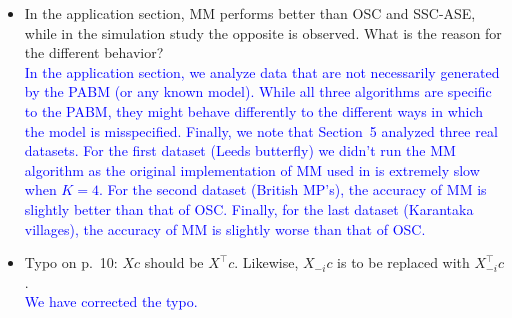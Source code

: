 \documentclass[
]{article}
\begin{document}
\begin{itemize}
{  }
\item
  In the application section, MM performs better than OSC and SSC-ASE,
  while in the simulation study the opposite is observed. What is the
  reason for the different behavior?\\
  \textcolor{blue}{
  In the application section, we analyze data that are not necessarily generated by the PABM (or any known model). 
  While all three algorithms are specific to the PABM, they might behave
  differently to the different ways in which the model is
  misspecified. Finally, we note that Section~5 analyzed three real
  datasets. For the first dataset (Leeds butterfly) we didn't run the MM
  algorithm as the original implementation of MM used in 
  \cite{307cbeb9b1be48299388437423d94bf1} is extremely slow when $K = 4$. For
  the second dataset (British MP's), the accuracy of MM is slightly
  better than that of OSC. Finally, for the last dataset (Karantaka
  villages), the accuracy of MM is slightly worse than that of OSC. }
\item
  Typo on p.~10: \(X c\) should be \(X^\top c\). Likewise, \(X_{-i} c\)
  is to be replaced with \(X_{-i}^\top c\).\\
  \textcolor{blue}{
  We have corrected the typo.
  }
\end{itemize}

\newpage

  
\end{document}
